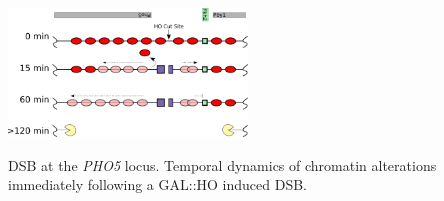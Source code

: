 \begin{floatingfigure}[r]{2.5in}
\vspace{-8mm}
\begin{center}
\includegraphics[width=2.5in]{r35_figures/cut_process.png}
\end{center}
\vspace{4mm}
\caption{DSB at the \textit{PHO5} locus. Temporal dynamics of chromatin alterations immediately following a GAL::HO induced DSB. }%
\end{floatingfigure}


